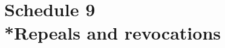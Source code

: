 \documentclass[12pt,a4paper]{article}
\begin{document}
\part[Schedule 9 --- Repeals and revocations]{Schedule 9\\*Repeals and revocations}

\end{document}
